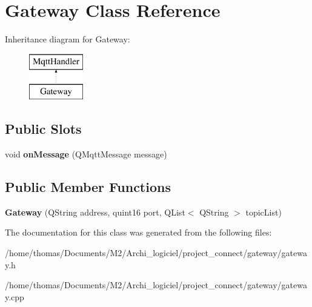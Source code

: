 \hypertarget{classGateway}{}\section{Gateway Class Reference}
\label{classGateway}
Inheritance diagram for Gateway\+:\begin{figure}[H]
\begin{center}
\leavevmode
\includegraphics[height=2.000000cm]{classGateway}
\end{center}
\end{figure}
\subsection*{Public Slots}
\begin{DoxyCompactItemize}
\item 
\mbox{\label{classGateway_ac01214063bf478d3b9ea55fd2bcfde5c}} 
void {\bfseries on\+Message} (Q\+Mqtt\+Message message)
\end{DoxyCompactItemize}
\subsection*{Public Member Functions}
\begin{DoxyCompactItemize}
\item 
\mbox{\label{classGateway_a8fe609498219f1284486b6f7b9b6abd5}} 
{\bfseries Gateway} (Q\+String address, quint16 port, Q\+List$<$ Q\+String $>$ topic\+List)
\end{DoxyCompactItemize}


The documentation for this class was generated from the following files\+:\begin{DoxyCompactItemize}
\item 
/home/thomas/\+Documents/\+M2/\+Archi\+\_\+logiciel/project\+\_\+connect/gateway/gateway.\+h\item 
/home/thomas/\+Documents/\+M2/\+Archi\+\_\+logiciel/project\+\_\+connect/gateway/gateway.\+cpp\end{DoxyCompactItemize}
